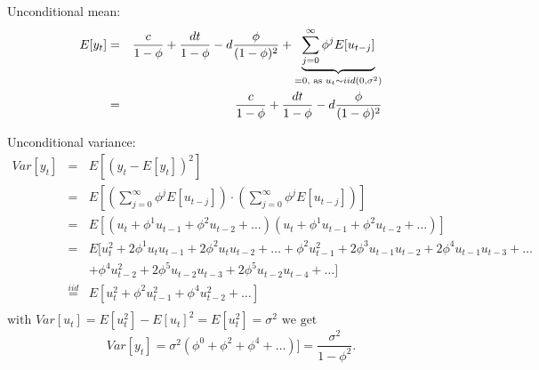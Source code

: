\begin{enumerate}
\begin{solution}
              Unconditional mean:
              \begin{eqnarray*}
                  E[y_{t}] &=& \frac{c}{1-\phi} + \frac{dt}{1-\phi} - d \frac{\phi}{(1 - \phi)^2}  + \underbrace{\sum_{j=0}^{\infty} \phi^j E[u_{t-j}]}_{=0 \text{, as } \space  u_{t} \sim iid(0, \sigma^2)} \\
                  &=& \frac{c}{1-\phi} + \frac{dt}{1-\phi} - d \frac{\phi}{(1 - \phi)^2}
              \end{eqnarray*}

              Unconditional variance:
              \begin{eqnarray*}
                  Var[y_{t}]
                  &=& E[(y_{t} - E[y_{t}])^2 ] \\
                  &=& E[(\sum_{j=0}^{\infty} \phi^j E[u_{t-j}]) \cdot (\sum_{j=0}^{\infty} \phi^j E[u_{t-j}])] \\
                  &=& E[(u_{t} + \phi^1 u_{t-1} + \phi^2 u_{t-2} + \dots)(u_{t} + \phi^1 u_{t-1} + \phi^2 u_{t-2} + \dots)] \\
                  &=& E[	u_{t}^2 + 2\phi^1 u_{t}u_{t-1} + 2\phi^2 u_{t}u_{t-2} + \dots +
                  \phi^2 u_{t-1}^2 + 2\phi^3 u_{t-1}u_{t-2} + 2\phi^4 u_{t-1}u_{t-3} + \dots  \\
                  &&+ \phi^4 u_{t-2}^2 + 2\phi^5 u_{t-2}u_{t-3} + 2\phi^5 u_{t-2}u_{t-4} + \dots ] \\
                  &\overset{iid}{=}& E [ u_{t}^2+ \phi^2 u_{t-1}^2 + \phi^4 u_{t-2}^2 + \dots ] \\
              \end{eqnarray*}
              $\text{with } Var[u_{t}] = E[u_{t}^2] - E[u_{t}]^2 = E[u_{t}^2] = \sigma^2 \text{ we get}$
              \begin{displaymath}
                  Var[y_{t}] = \sigma^2 ( \phi^0 + \phi^2 + \phi^4 + \dots )] = \frac{\sigma^2}{1-\phi^2}.
              \end{displaymath}


\end{solution}
\end{enumerate}
